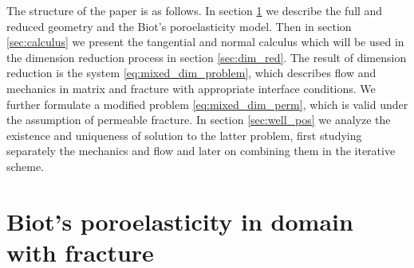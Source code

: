 \documentclass[a4paper]{m2an}
\numberwithin{equation}{section}
\begin{document}
The structure of the paper is as follows.
In section \ref{sec:model} we describe the full and reduced geometry and the Biot's poroelasticity model.
Then in section \ref{sec:calculus} we present the tangential and normal calculus which will be used in the dimension reduction process in section \ref{sec:dim_red}.
The result of dimension reduction is the system \eqref{eq:mixed_dim_problem}, which describes flow and mechanics in matrix and fracture with appropriate interface conditions.
We further formulate a modified problem \eqref{eq:mixed_dim_perm}, which is valid under the assumption of permeable fracture.
In section \ref{sec:well_pos} we analyze the existence and uniqueness of solution to the latter problem, first studying separately the mechanics and flow and later on combining them in the iterative scheme.


\section{Biot's poroelasticity in domain with fracture}\label{sec:model}
\end{document}
